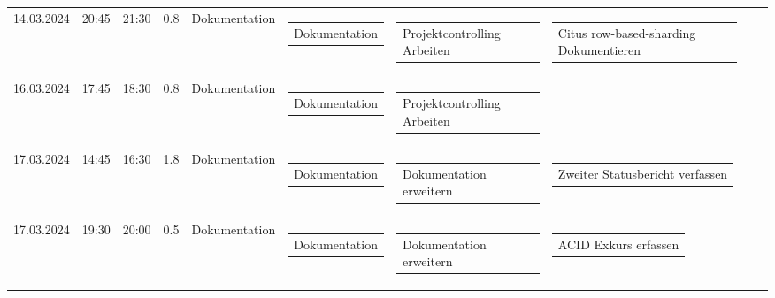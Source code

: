 {\begin{longtable}[H]{lllrllllll}
14.03.2024 & 20:45 & 21:30 & 0.8 & Dokumentation & \begin{tabular}[c]{@{}l@{}}Dokumentation\end{tabular} & \begin{tabular}[c]{@{}l@{}}Projektcontrolling Arbeiten\end{tabular} & \begin{tabular}[c]{@{}l@{}}Citus row-based-sharding Dokumentieren\end{tabular} & \begin{tabular}[c]{@{}l@{}}\end{tabular} & \begin{tabular}[c]{@{}l@{}}\end{tabular} \\
16.03.2024 & 17:45 & 18:30 & 0.8 & Dokumentation & \begin{tabular}[c]{@{}l@{}}Dokumentation\end{tabular} & \begin{tabular}[c]{@{}l@{}}Projektcontrolling Arbeiten\end{tabular} & \begin{tabular}[c]{@{}l@{}}\end{tabular} & \begin{tabular}[c]{@{}l@{}}\end{tabular} & \begin{tabular}[c]{@{}l@{}}\end{tabular} \\
17.03.2024 & 14:45 & 16:30 & 1.8 & Dokumentation & \begin{tabular}[c]{@{}l@{}}Dokumentation\end{tabular} & \begin{tabular}[c]{@{}l@{}}Dokumentation erweitern\end{tabular} & \begin{tabular}[c]{@{}l@{}}Zweiter Statusbericht verfassen\end{tabular} & \begin{tabular}[c]{@{}l@{}}\end{tabular} & \begin{tabular}[c]{@{}l@{}}\end{tabular} \\
17.03.2024 & 19:30 & 20:00 & 0.5 & Dokumentation & \begin{tabular}[c]{@{}l@{}}Dokumentation\end{tabular} & \begin{tabular}[c]{@{}l@{}}Dokumentation erweitern\end{tabular} & \begin{tabular}[c]{@{}l@{}}ACID Exkurs erfassen\end{tabular} & \begin{tabular}[c]{@{}l@{}}\end{tabular} & \begin{tabular}[c]{@{}l@{}}\end{tabular} \\

\end{longtable}}
